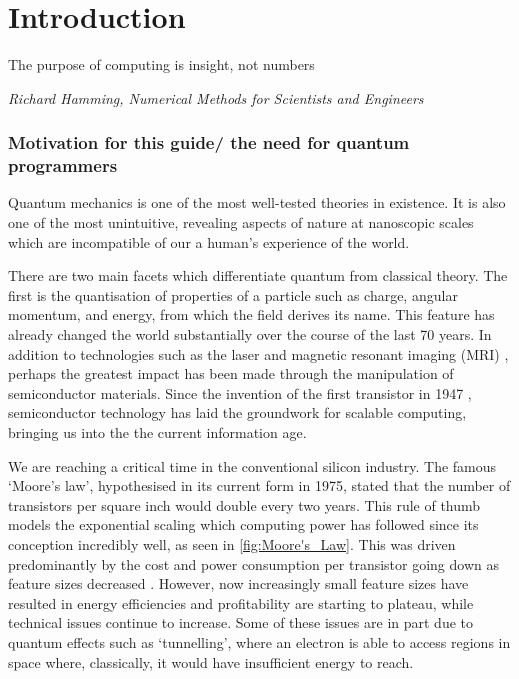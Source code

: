 \chapter{Introduction}
\label{chpt:intro}

\epigraph{The purpose of computing is insight, not numbers}{\textit{Richard Hamming, Numerical Methods for Scientists and Engineers}}



\subsection{Motivation for this guide/ the need for quantum programmers}

Quantum mechanics is one of the most well-tested theories in existence. It is also one of the most unintuitive, revealing aspects of nature at nanoscopic scales which are incompatible of our a human's experience of the world. 

There are two main facets which differentiate quantum from classical theory. The first is the quantisation of properties of a particle such as charge, angular momentum, and energy, from which the field derives its name. This feature has already changed the world substantially over the course of the last 70 years. In addition to technologies such as the laser and magnetic resonant imaging (MRI) \cite{ioplasers, odaibo2012quantumMRI}, perhaps the greatest impact has been made through the manipulation of semiconductor materials. Since the invention of the first transistor in 1947 \cite{Bardeen1948}, semiconductor technology has laid the groundwork for scalable computing, bringing us into the the current information age.

We are reaching a critical time in the conventional silicon industry. The famous `Moore's law', hypothesised in its current form in 1975, stated that the number of transistors per square inch would double every two years. This rule of thumb models the exponential scaling which computing power has followed since its conception incredibly well, as seen in \autoref{fig:Moore's_Law}. This was driven predominantly by the cost and power consumption per transistor going down as feature sizes decreased \cite{MooresLawEconomist}.  However, now increasingly small feature sizes have resulted in energy efficiencies and profitability are starting to plateau, while technical issues continue to increase. Some of these issues are in part due to quantum effects such as `tunnelling', where an electron is able to access regions in space where, classically, it would have insufficient energy to reach.  

